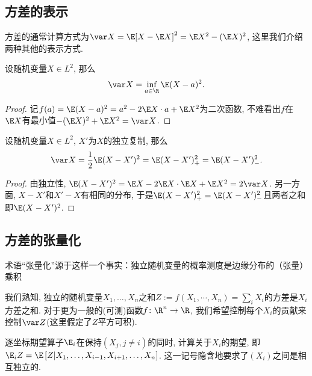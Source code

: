 \subsection{方差的表示}

方差的通常计算方式为$\var X = \E[X - \E X]^2 = \E X^2 - (\E X)^2$, 这里我们介绍两种其他的表示方式. 

\begin{lemma}[方差的变分表示]
	设随机变量$X \in L^2$, 那么
	\begin{equation*}
		\var X = \inf_{a \in \R} \E (X - a)^2. 
	\end{equation*}
\end{lemma}
\begin{proof}
	记$f(a) =  \E (X - a)^2 = a^2 - 2 \E X \cdot a + \E X^2$为二次函数, 不难看出$f$在$\E X$有最小值$- (\E X)^2 + \E X^2 = \var X$. 
\end{proof}

\begin{lemma}[独立复制]
	设随机变量$X \in L^2$, $X'$为$X$的独立复制, 那么
	\begin{equation*}
		\var X = \frac12 \E (X - X')^2
		= \E (X - X')_+^2 = \E (X - X')_-^2. 
	\end{equation*}
\end{lemma}
\begin{proof}
	由独立性, $\E (X - X')^2 = \E X - 2 \E X \cdot \E X + \E X^2 = 2 \var X$. 
	另一方面, $X - X'$和$X' - X$有相同的分布, 于是$\E(X - X')_+^2 = \E(X - X')_-^2$且两者之和即$\E (X - X')^2$. 
\end{proof}

\subsection{方差的张量化}

术语“张量化”源于这样一个事实：独立随机变量的概率测度是边缘分布的（张量）乘积

我们熟知, 独立的随机变量$X_1, \dots, X_n$之和$Z := f(X_1, \cdots, X_n) = \sum_i X_i$的方差是$X_i$方差之和. 
对于更为一般的(可测)函数$f \colon \R^n \to \R$, 我们希望控制每个$X_i$的贡献来控制$\var Z$(这里假定了$Z$平方可积). 

\begin{definition}[逐坐标期望]
	逐坐标期望算子$\E_i$在保持$(X_j, j \neq i)$的同时, 计算关于$X_i$的期望, 即$\E_i Z 
		= \E\left[ Z | X_1, \dots, X_{i-1}, X_{i+1}, \dots, X_n \right]$. 
	这一记号隐含地要求了$(X_i)$之间是相互独立的. 
\end{definition}

